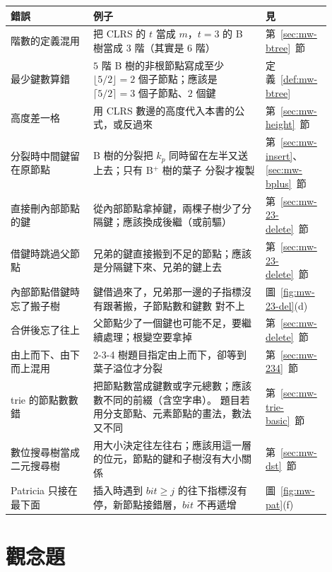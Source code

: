 \begin{center}
\begin{tabular}{p{0.24\linewidth}p{0.50\linewidth}p{0.16\linewidth}}
\toprule
錯誤 & 例子 & 見 \\
\midrule
階數的定義混用 & 把 CLRS 的 $t$ 當成 $m$，$t = 3$ 的 B 樹當成 $3$ 階（其實是 $6$ 階） &
第~\ref{sec:mw-btree}~節 \\
最少鍵數算錯 & $5$ 階 B 樹的非根節點寫成至少 $\lfloor 5/2 \rfloor = 2$ 個子節點；應該是
$\lceil 5/2 \rceil = 3$ 個子節點、$2$ 個鍵 & 定義~\ref{def:mw-btree} \\
高度差一格 & 用 CLRS 數邊的高度代入本書的公式，或反過來 & 第~\ref{sec:mw-height}~節 \\
分裂時中間鍵留在原節點 & B 樹的分裂把 $k_p$ 同時留在左半又送上去；只有 B$^{+}$ 樹的葉子
分裂才複製 & 第~\ref{sec:mw-insert}、\ref{sec:mw-bplus}~節 \\
直接刪內部節點的鍵 & 從內部節點拿掉鍵，兩棵子樹少了分隔鍵；應該換成後繼（或前驅） &
第~\ref{sec:mw-23-delete}~節 \\
借鍵時跳過父節點 & 兄弟的鍵直接搬到不足的節點；應該是分隔鍵下來、兄弟的鍵上去 &
第~\ref{sec:mw-23-delete}~節 \\
內部節點借鍵時忘了搬子樹 & 鍵借過來了，兄弟那一邊的子指標沒有跟著搬，子節點數和鍵數
對不上 & 圖~\ref{fig:mw-23-del}(d) \\
合併後忘了往上 & 父節點少了一個鍵也可能不足，要繼續處理；根變空要拿掉 &
第~\ref{sec:mw-delete}~節 \\
由上而下、由下而上混用 & 2-3-4 樹題目指定由上而下，卻等到葉子溢位才分裂 &
第~\ref{sec:mw-234}~節 \\
trie 的節點數數錯 & 把節點數當成鍵數或字元總數；應該數不同的前綴（含空字串）。 題目若用分支節點、元素節點的畫法，數法又不同 &
第~\ref{sec:mw-trie-basic}~節 \\
數位搜尋樹當成二元搜尋樹 & 用大小決定往左往右；應該用這一層的位元，節點的鍵和子樹沒有大小關係 &
第~\ref{sec:mw-dst}~節 \\
Patricia 只接在最下面 & 插入時遇到 $\mathit{bit} \ge j$ 的往下指標沒有停，新節點接錯層，$\mathit{bit}$ 不再遞增 &
圖~\ref{fig:mw-pat}(f) \\
\bottomrule
\end{tabular}
\end{center}

\section{觀念題}
\label{sec:mw-exercises}

